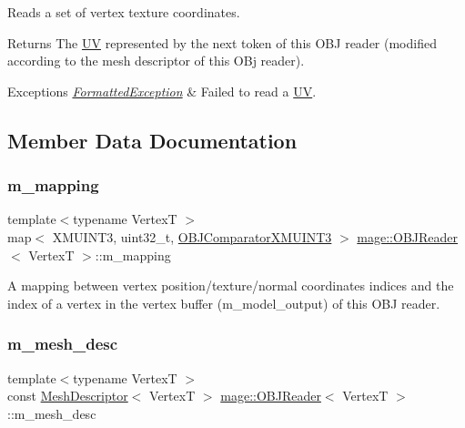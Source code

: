 Reads a set of vertex texture coordinates.

\begin{DoxyReturn}{Returns}
The {\ttfamily \hyperlink{structmage_1_1_u_v}{UV}} represented by the next token of this O\+BJ reader (modified according to the mesh descriptor of this O\+Bj reader). 
\end{DoxyReturn}

\begin{DoxyExceptions}{Exceptions}
{\em \hyperlink{structmage_1_1_formatted_exception}{Formatted\+Exception}} & Failed to read a {\ttfamily \hyperlink{structmage_1_1_u_v}{UV}}. \\
\hline
\end{DoxyExceptions}


\subsection{Member Data Documentation}
\hypertarget{classmage_1_1_o_b_j_reader_a3783d5387bcba3d593437f9e2c350387}{}\label{classmage_1_1_o_b_j_reader_a3783d5387bcba3d593437f9e2c350387} 
\subsubsection{\texorpdfstring{m\+\_\+mapping}{m\_mapping}}
{\footnotesize\ttfamily template$<$typename VertexT $>$ \\
map$<$ X\+M\+U\+I\+N\+T3, uint32\+\_\+t, \hyperlink{structmage_1_1_o_b_j_reader_1_1_o_b_j_comparator_x_m_u_i_n_t3}{O\+B\+J\+Comparator\+X\+M\+U\+I\+N\+T3} $>$ \hyperlink{classmage_1_1_o_b_j_reader}{mage\+::\+O\+B\+J\+Reader}$<$ VertexT $>$\+::m\+\_\+mapping\hspace{0.3cm}{\ttfamily [private]}}

A mapping between vertex position/texture/normal coordinates\textquotesingle{} indices and the index of a vertex in the vertex buffer ({\ttfamily m\+\_\+model\+\_\+output}) of this O\+BJ reader. \hypertarget{classmage_1_1_o_b_j_reader_a4b5810a694e2223de437e62bba748bc8}{}\label{classmage_1_1_o_b_j_reader_a4b5810a694e2223de437e62bba748bc8} 
\subsubsection{\texorpdfstring{m\+\_\+mesh\+\_\+desc}{m\_mesh\_desc}}
{\footnotesize\ttfamily template$<$typename VertexT $>$ \\
const \hyperlink{structmage_1_1_mesh_descriptor}{Mesh\+Descriptor}$<$ VertexT $>$ \hyperlink{classmage_1_1_o_b_j_reader}{mage\+::\+O\+B\+J\+Reader}$<$ VertexT $>$\+::m\+\_\+mesh\+\_\+desc\hspace{0.3cm}{\ttfamily [private]}}

